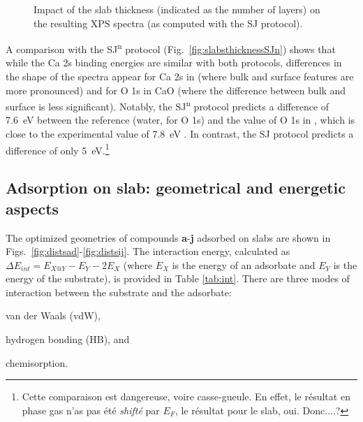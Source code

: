 \documentclass[journal=jpccck,manuscript=article]{achemso}
\begin{document}
\begin{figure}[!h]
	\centering
	\caption{Impact of the slab thickness (indicated as the number of layers) on the resulting XPS spectra (as computed with the SJ protocol).}
	\label{fig:slabsthickness}
\end{figure}

A comparison with the SJ\textsuperscript{n} protocol (Fig.~\ref{fig:slabsthicknessSJn}) shows that while the Ca 2s binding energies are similar with both protocols, differences in the shape of the spectra appear for Ca 2s in  (where bulk and surface features are more pronounced) and for O 1s in CaO (where the difference between bulk and surface is less significant). Notably, the SJ\textsuperscript{n} protocol predicts a difference of \SI{7.6}{\electronvolt} between the reference (water, for O 1s) and the value of O 1s in , which is close to the experimental value of \SI{7.8}{\electronvolt} \cite{cristHandbookMonochromaticXPS1999}. In contrast, the SJ protocol predicts a difference of only \SI{5}{\electronvolt}.\footnote{Cette comparaison est dangereuse, voire casse-gueule. En effet, le résultat en phase gas n'as pas été \textit{shifté} par $E_F$, le résultat pour le slab, oui. Donc....?}

\subsection{Adsorption on slab: geometrical and energetic aspects}

The optimized geometries of compounds \textbf{a}-\textbf{j} adsorbed on slabs are shown in Figs.~\ref{fig:distsad}-\ref{fig:distsij}. The interaction energy, calculated as $\Delta E_{int} = E_{X@Y} - E_Y - 2E_X$ (where $E_X$ is the energy of an adsorbate and $E_Y$ is the energy of the substrate), is provided in Table \ref{tab:int}. There are three modes of interaction between the substrate and the adsorbate: \begin{inparaenum}[i)]
	\item van der Waals (vdW),
	\item hydrogen bonding (HB), and
	\item chemisorption.
\end{inparaenum}
\end{document}
